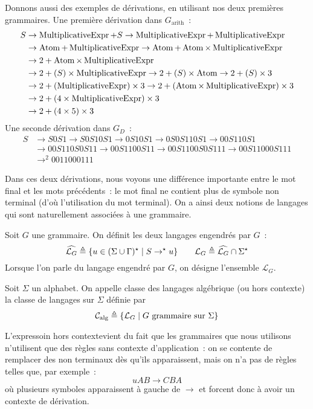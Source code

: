 Donnons aussi des exemples de dérivations, en utilisant nos deux premières
grammaires. Une première dérivation dans $G_{\mathrm{arith}}$~:
\begin{align*}
  S &\to \operatorname{MultiplicativeExpr} + S \to \operatorname{MultiplicativeExpr} + \operatorname{MultiplicativeExpr} \\
  &\to \operatorname{Atom} + \operatorname{MultiplicativeExpr} \to \operatorname{Atom} + \operatorname{Atom} \times \operatorname{MultiplicativeExpr} \\
  &\to 2 + \operatorname{Atom}\times \operatorname{MultiplicativeExpr} \\
  &\to 2 + (S)\times \operatorname{MultiplicativeExpr} \to 2 + (S) \times \operatorname{Atom} \to 2 + (S) \times 3\\
  &\to 2 + (\operatorname{MultiplicativeExpr}) \times 3 \to 2 + (\operatorname{Atom} \times \operatorname{MultiplicativeExpr}) \times 3\\
  &\to 2 + (4 \times \operatorname{MultiplicativeExpr}) \times 3\\
  &\to 2 + (4 \times 5) \times 3
\end{align*}
Une seconde dérivation dans $G_D$~:
\begin{align*}
  S &\to S0S1 \to S0S10S1 \to 0S10S1\to 0S0S110S1 \to 00S110S1 \\
  &\to 00S110S0S11 \to 00S1100S11 \to 00S1100S0S111\to 00S11000S111\\
  &\to^2 0011000111
\end{align*}

Dans ces deux dérivations, nous voyons une différence importante entre le mot
final et les mots précédents~: le mot final ne contient plus de symbole non
terminal (d'où l'utilisation du mot \og terminal\fg). On a ainsi deux notions de
langages qui sont naturellement associées à une grammaire.

\begin{definition}
  Soit $G$ une grammaire. On définit les deux langages engendrés par $G$~:
  \[\widehat{\mathcal L_G}\triangleq \{u \in (\Sigma\cup\Gamma)^\star\mid
  S\to^\star u\}
  \qquad \mathcal L_G \triangleq \widehat{\mathcal L_G}\cap \Sigma^\star\]
  Lorsque l'on parle du langage engendré par $G$, on désigne l'ensemble
  $\mathcal L_G$.
\end{definition}

\begin{definition}
  Soit $\Sigma$ un alphabet. On appelle classe des langages algébrique (ou hors
  contexte) la classe de langages sur $\Sigma$ définie par
  \[\mathcal C_{\mathrm{alg}}\triangleq \{\mathcal L_G\mid
  G \text{ grammaire sur }\Sigma\}\]
\end{definition}

\begin{remark}
  L'expressoin \og hors contexte\fg vient du fait que les grammaires que nous
  utilisons n'utilisent que des règles sans contexte d'application~: on se
  contente de remplacer des non terminaux dès qu'ils apparaissent, mais on n'a
  pas de règles telles que, par exemple~:
  \[uAB \to CBA\]
  où plusieurs symboles apparaissent à gauche de $\to$ et forcent donc à avoir
  un contexte de dérivation.
\end{remark}


